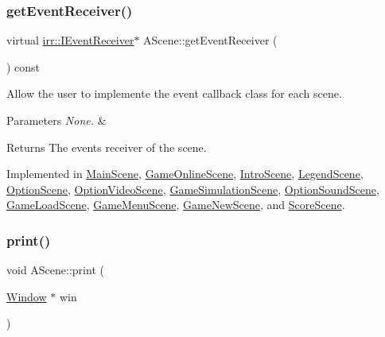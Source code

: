 \subsubsection{\texorpdfstring{get\+Event\+Receiver()}{getEventReceiver()}}
{\footnotesize\ttfamily virtual \hyperlink{classirr_1_1IEventReceiver}{irr\+::\+I\+Event\+Receiver}$\ast$ A\+Scene\+::get\+Event\+Receiver (\begin{DoxyParamCaption}{ }\end{DoxyParamCaption}) const\hspace{0.3cm}{\ttfamily [pure virtual]}}



Allow the user to implemente the event callback class for each scene. 


\begin{DoxyParams}{Parameters}
{\em None.} & \\
\hline
\end{DoxyParams}
\begin{DoxyReturn}{Returns}
The events\textquotesingle{} receiver of the scene. 
\end{DoxyReturn}


Implemented in \hyperlink{classMainScene_af9fbc6337aa6ff42447c702e91e77237}{Main\+Scene}, \hyperlink{classGameOnlineScene_a00ce9773db4f1886fc463b023cbf63f9}{Game\+Online\+Scene}, \hyperlink{classIntroScene_acabf925dab7b2a346edd398445cd5800}{Intro\+Scene}, \hyperlink{classLegendScene_ab11340ae844c04d704f28e1ef188deae}{Legend\+Scene}, \hyperlink{classOptionScene_a8848b9040ee7fd9c1d05a22181c5e053}{Option\+Scene}, \hyperlink{classOptionVideoScene_a84625e871c5176d7abc77a7f12c1472a}{Option\+Video\+Scene}, \hyperlink{classGameSimulationScene_a048b2a937caff3af7b4d54f8bd404ec1}{Game\+Simulation\+Scene}, \hyperlink{classOptionSoundScene_ac71da65763f0db4b05fc32444308b677}{Option\+Sound\+Scene}, \hyperlink{classGameLoadScene_a81807790ad65bd2cf97a1e543cae2b74}{Game\+Load\+Scene}, \hyperlink{classGameMenuScene_adcb01430b24486c4e5d0157fc32d7611}{Game\+Menu\+Scene}, \hyperlink{classGameNewScene_a21c27ef3ea1923d975683e1bcdd134fa}{Game\+New\+Scene}, and \hyperlink{classScoreScene_ae398ba58a33b3605a0c71265202534e2}{Score\+Scene}.

\mbox{\label{classAScene_ae5d7463a823ed64f3846b5847340b68c}} 
\subsubsection{\texorpdfstring{print()}{print()}}
{\footnotesize\ttfamily void A\+Scene\+::print (\begin{DoxyParamCaption}\item[{\hyperlink{classWindow}{Window} $\ast$}]{win }\end{DoxyParamCaption})}



